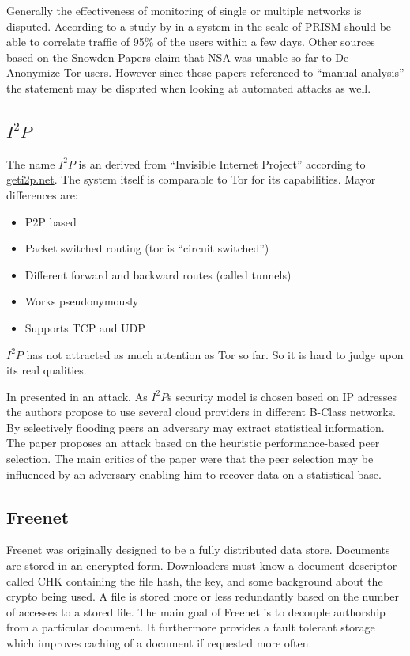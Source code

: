 Generally the effectiveness of monitoring of single or multiple networks is disputed. According to a study by \citeauthor{ccs2013-usersrouted} in \citeyear{ccs2013-usersrouted}\cite{ccs2013-usersrouted} a system in the scale of PRISM should be able to correlate traffic of 95\% of the users within a few days. Other sources based on the Snowden Papers claim that NSA was unable so far to De-Anonymize Tor users. However since these papers referenced to ``manual analysis'' the  statement may be disputed when looking at automated attacks as well.


\subsection{$I^2P$}
The name $I^2P$ is an derived from  ``Invisible Internet Project'' according to \href{https://geti2p.net/}{geti2p.net}. The system itself is comparable to Tor for its capabilities. Mayor differences are:
\begin{itemize}
	\item P2P based
	\item Packet switched routing (tor is ``circuit switched'')
	\item Different forward and backward routes (called tunnels)
	\item Works pseudonymously
	\item Supports TCP and UDP
\end{itemize}

$I^2P$ has not attracted as much attention as Tor so far. So it is hard to judge upon its real qualities.

In \citeyear{pets2011-i2p} \citeauthor{pets2011-i2p} presented in \cite{pets2011-i2p} an attack. As $I^2P$s security model is chosen based on IP adresses the authors propose to use several cloud providers in different B-Class networks. By selectively flooding peers an adversary may extract statistical information. The paper proposes an attack based on the heuristic performance-based peer selection. The main critics of the paper were that the peer selection may be influenced by an adversary enabling him to recover data on a statistical base.

\subsection{Freenet}
Freenet was originally designed to be a fully distributed data store\cite{freenet}. Documents are stored in an encrypted form. Downloaders must know a document descriptor called CHK containing the file hash, the key, and some background about the crypto being used. A file is stored more or less redundantly based on the number of accesses to a stored file. The main goal of Freenet is to decouple  authorship from a particular document. It furthermore provides a fault tolerant storage which improves caching of a document if requested more often.

